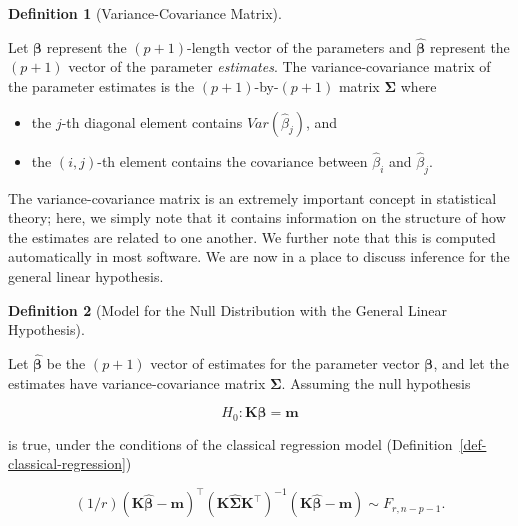 \documentclass[
  letterpaper,
  DIV=11,
  numbers=noendperiod]{scrreprt}
\providecommand{\tightlist}{%
  \setlength{\itemsep}{0pt}\setlength{\parskip}{0pt}}\usepackage{longtable,booktabs,array}
\theoremstyle{definition}
\theoremstyle{definition}
\newtheorem{definition}{Definition}[chapter]
\theoremstyle{remark}
\begin{document}
\begin{definition}[Variance-Covariance
Matrix]\protect\hypertarget{def-variance-covariance-matrix}{}\label{def-variance-covariance-matrix}

Let \(\boldsymbol{\beta}\) represent the \((p+1)\)-length vector of the
parameters and \(\widehat{\boldsymbol{\beta}}\) represent the \((p+1)\)
vector of the parameter \emph{estimates}. The variance-covariance matrix
of the parameter estimates is the \((p+1)\)-by-\((p+1)\) matrix
\(\boldsymbol{\Sigma}\) where

\begin{itemize}
\tightlist
\item
  the \(j\)-th diagonal element contains
  \(Var\left(\widehat{\beta}_j\right)\), and
\item
  the \((i,j)\)-th element contains the covariance between
  \(\widehat{\beta}_i\) and \(\widehat{\beta}_j\).
\end{itemize}

\end{definition}

The variance-covariance matrix is an extremely important concept in
statistical theory; here, we simply note that it contains information on
the structure of how the estimates are related to one another. We
further note that this is computed automatically in most software. We
are now in a place to discuss inference for the general linear
hypothesis.

\begin{definition}[Model for the Null Distribution with the General
Linear
Hypothesis]\protect\hypertarget{def-general-linear-hypothesis-null}{}\label{def-general-linear-hypothesis-null}

Let \(\widehat{\boldsymbol{\beta}}\) be the \((p+1)\) vector of
estimates for the parameter vector \(\boldsymbol{\beta}\), and let the
estimates have variance-covariance matrix \(\boldsymbol{\Sigma}\).
Assuming the null hypothesis

\[H_0: \mathbf{K} \boldsymbol{\beta} = \mathbf{m}\]

is true, under the conditions of the classical regression model
(Definition~\ref{def-classical-regression})

\[(1/r) \left(\mathbf{K}\widehat{\boldsymbol{\beta}} - \mathbf{m}\right)^\top \left(\mathbf{K}\widehat{\boldsymbol{\Sigma}}\mathbf{K}^\top\right)^{-1} \left(\mathbf{K}\widehat{\boldsymbol{\beta}} - \mathbf{m}\right) \sim F_{r, n-p-1}.\]

\end{definition}
\end{document}
